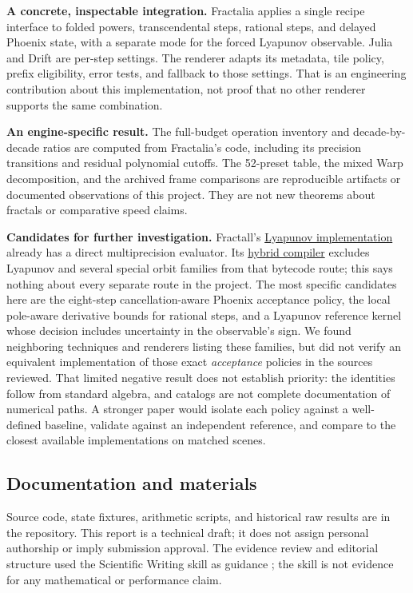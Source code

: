 \documentclass[11pt,a4paper]{article}
\numberwithin{equation}{section}
\begin{document}
\textbf{A concrete, inspectable integration.}
Fractalia applies a single recipe interface to folded powers,
transcendental steps, rational steps, and delayed Phoenix state, with
a separate mode for the forced Lyapunov observable. Julia and Drift
are per-step settings. The renderer adapts its metadata, tile policy,
prefix eligibility, error tests, and fallback to those settings.
That is an engineering contribution about this implementation, not
proof that no other renderer supports the same combination.

\textbf{An engine-specific result.}
The full-budget operation inventory and decade-by-decade ratios are
computed from Fractalia's code, including its precision transitions
and residual polynomial cutoffs. The 52-preset table, the mixed
Warp decomposition, and the archived frame comparisons are
reproducible artifacts or documented observations of this project.
They are not new theorems about fractals or comparative speed claims.

\textbf{Candidates for further investigation.}
Fractall's \href{https://github.com/habib256/fractall-rust/blob/main/src/fractal/lyapunov.rs}{Lyapunov implementation}
already has a direct multiprecision evaluator. Its
\href{https://github.com/habib256/fractall-rust/blob/main/src/fractal/bytecode/compile.rs}{hybrid compiler}
excludes Lyapunov and several special orbit families from that
bytecode route; this says nothing about every separate route in the
project. The most specific candidates here are the eight-step cancellation-aware
Phoenix acceptance policy, the local pole-aware derivative bounds
for rational steps, and a Lyapunov reference kernel whose decision
includes uncertainty in the observable's sign. We found neighboring
techniques and renderers listing these families, but did not verify an
equivalent implementation of those exact \emph{acceptance} policies in the sources
reviewed. That limited negative result does not establish priority:
the identities follow from standard algebra, and catalogs are not
complete documentation of numerical paths. A stronger paper would
isolate each policy against a well-defined baseline, validate
against an independent reference, and compare to the closest
available implementations on matched scenes.

\subsection{Documentation and materials}

Source code, state fixtures, arithmetic scripts, and historical raw
results are in the repository. This report is a technical draft; it
does not assign personal authorship or imply submission approval.
The evidence review and editorial structure used the Scientific
Writing skill as guidance \cite{skills}; the skill is not evidence
for any mathematical or performance claim.
\end{document}
